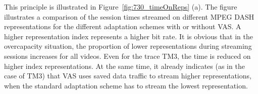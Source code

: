 This principle is illustrated in Figure~\ref{fig:730_timeOnReps} (a).
The figure illustrates a comparison of the session times streamed on different \ac{MPEG} \ac{DASH} representations for the different adaptation schemes with or without \ac{VAS}.
A higher representation index represents a higher bit rate.
It is obvious that in the overcapacity situation, the proportion of lower representations during streaming sessions increases for all videos.
Even for the trace TM3, the time is reduced on higher index representations. 
At the same time, it already indicates (as in the case of TM3) that \ac{VAS} uses saved data traffic to stream higher representations, when the standard adaptation scheme has to stream the lowest representation.
\begin{figure}[!ht]
 \centering

\end{figure}
